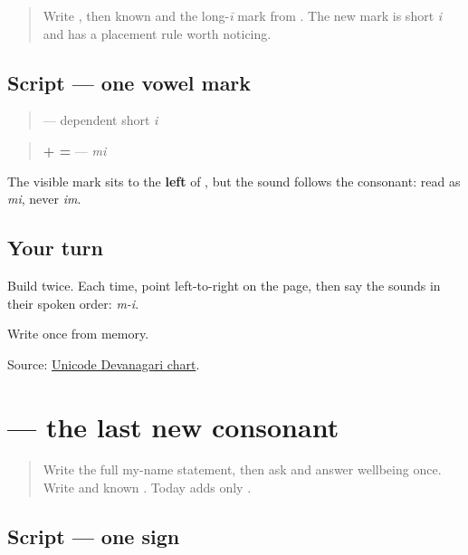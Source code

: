 \begin{quote}
Write \textbf{}, then known \textbf{} and the long-\emph{ī} mark from \textbf{}. The new mark is short \emph{i} and has a placement rule worth noticing.
\end{quote}

\subsection*{Script — one vowel mark}
\begin{quote}
\textbf{} — dependent short \emph{i}
\end{quote}

\begin{quote}
\textbf{ +  = } — \emph{mi}
\end{quote}

The visible mark sits to the \textbf{left} of \textbf{}, but the sound follows the consonant: read \textbf{} as \emph{mi}, never \emph{im}.

\subsection*{Your turn}
Build \textbf{} twice. Each time, point left-to-right on the page, then say the sounds in their spoken order: \emph{m-i}.

\begin{tcolorbox}[breakable,colback=teal!4,colframe=teal!35!black,title={Before you move on}]
Write \textbf{} once from memory.

Source: \href{https://www.unicode.org/charts/PDF/U0900.pdf}{Unicode Devanagari chart}.
\end{tcolorbox}
\section[\texorpdfstring{\mw{ल} (la)}{ल (la)}]{ — the last new consonant}

\label{lesson:MW-W07-la}



\begin{quote}
Write the full my-name statement, then ask and answer wellbeing once. Write \textbf{} and known \textbf{}. Today adds only \textbf{}.
\end{quote}

\subsection*{Script — one sign}

